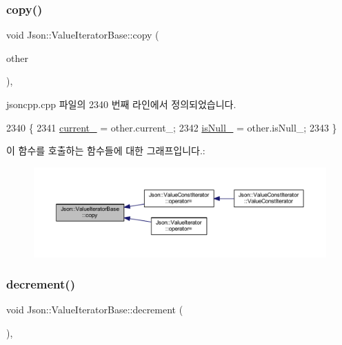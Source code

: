 \subsubsection{\texorpdfstring{copy()}{copy()}}
{\footnotesize\ttfamily void Json\+::\+Value\+Iterator\+Base\+::copy (\begin{DoxyParamCaption}\item[{const \hyperlink{class_json_1_1_value_iterator_base_a9d2a940d03ea06d20d972f41a89149ee}{Self\+Type} \&}]{other }\end{DoxyParamCaption})\hspace{0.3cm}{\ttfamily [protected]}, {\ttfamily [inherited]}}



jsoncpp.\+cpp 파일의 2340 번째 라인에서 정의되었습니다.


\begin{DoxyCode}
2340                                                   \{
2341   \hyperlink{class_json_1_1_value_iterator_base_ab3138ce8af8301cca3b041ea55cb922a}{current\_} = other.current\_;
2342   \hyperlink{class_json_1_1_value_iterator_base_a3e08b114a1aed9bde518c527f94a8c59}{isNull\_} = other.isNull\_;
2343 \}
\end{DoxyCode}
이 함수를 호출하는 함수들에 대한 그래프입니다.\+:
\nopagebreak
\begin{figure}[H]
\begin{center}
\leavevmode
\includegraphics[width=350pt]{class_json_1_1_value_iterator_base_a496e6aba44808433ec5858c178be5719_icgraph}
\end{center}
\end{figure}
\mbox{\label{class_json_1_1_value_iterator_base_affc8cf5ff54a9f432cc693362c153fa6}} 
\subsubsection{\texorpdfstring{decrement()}{decrement()}}
{\footnotesize\ttfamily void Json\+::\+Value\+Iterator\+Base\+::decrement (\begin{DoxyParamCaption}{ }\end{DoxyParamCaption})\hspace{0.3cm}{\ttfamily [protected]}, {\ttfamily [inherited]}}



